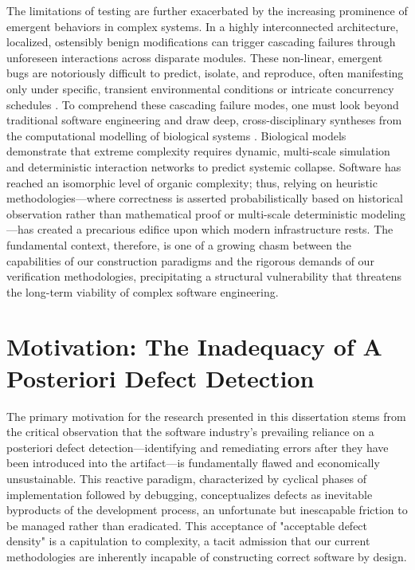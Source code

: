 The limitations of testing are further exacerbated by the increasing prominence of emergent behaviors in complex systems. In a highly interconnected architecture, localized, ostensibly benign modifications can trigger cascading failures through unforeseen interactions across disparate modules. These non-linear, emergent bugs are notoriously difficult to predict, isolate, and reproduce, often manifesting only under specific, transient environmental conditions or intricate concurrency schedules \cite{meyers2004effective}. To comprehend these cascading failure modes, one must look beyond traditional software engineering and draw deep, cross-disciplinary syntheses from the computational modelling of biological systems \cite{ref_Computationalmo3}. Biological models demonstrate that extreme complexity requires dynamic, multi-scale simulation and deterministic interaction networks to predict systemic collapse. Software has reached an isomorphic level of organic complexity; thus, relying on heuristic methodologies—where correctness is asserted probabilistically based on historical observation rather than mathematical proof or multi-scale deterministic modeling—has created a precarious edifice upon which modern infrastructure rests. The fundamental context, therefore, is one of a growing chasm between the capabilities of our construction paradigms and the rigorous demands of our verification methodologies, precipitating a structural vulnerability that threatens the long-term viability of complex software engineering.

\section{Motivation: The Inadequacy of A Posteriori Defect Detection}
\label{sec:intro_motivation}

The primary motivation for the research presented in this dissertation stems from the critical observation that the software industry's prevailing reliance on a posteriori defect detection—identifying and remediating errors after they have been introduced into the artifact—is fundamentally flawed and economically unsustainable. This reactive paradigm, characterized by cyclical phases of implementation followed by debugging, conceptualizes defects as inevitable byproducts of the development process, an unfortunate but inescapable friction to be managed rather than eradicated. This acceptance of "acceptable defect density" is a capitulation to complexity, a tacit admission that our current methodologies are inherently incapable of constructing correct software by design.

